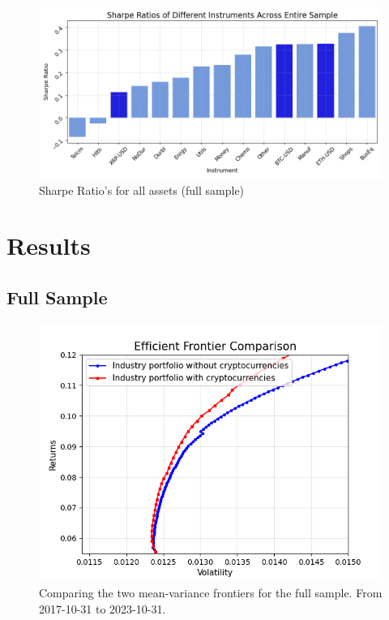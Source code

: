 \documentclass[12pt,a4paper]{article}
\begin{document}
\begin{figure}[H]
    \centering
    \includegraphics[width=1\linewidth]{Figures/SR_Entire_Sample.png}
    \caption{Sharpe Ratio's for all assets (full sample)}
    \label{fig:Sharpe}
\end{figure}


\section{Results}\label{sec:results}

\subsection{Full Sample}\label{sec:full sample}
\begin{figure}[H]
    \centering
    \includegraphics[width=0.9\linewidth]{Figures/Efficient_Frontier_Comparison_Full_Sample.png}
    \caption{Comparing the two mean-variance frontiers for the full sample. From 2017-10-31 to 2023-10-31.}
    \label{fig:full}
\end{figure}
\end{document}
